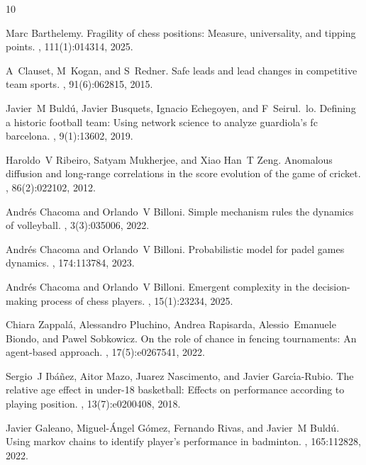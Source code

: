 \documentclass[preprint,12pt]{elsarticle}
\begin{document}
\begin{thebibliography}{10}

Marc Barthelemy.
\newblock Fragility of chess positions: Measure, universality, and tipping
  points.
, 111(1):014314, 2025.

A~Clauset, M~Kogan, and S~Redner.
\newblock Safe leads and lead changes in competitive team sports.
, 91(6):062815, 2015.

Javier~M Buld{\'u}, Javier Busquets, Ignacio Echegoyen, and F~Seirul.~lo.
\newblock Defining a historic football team: Using network science to analyze
  guardiola’s fc barcelona.
, 9(1):13602, 2019.

Haroldo~V Ribeiro, Satyam Mukherjee, and Xiao Han~T Zeng.
\newblock Anomalous diffusion and long-range correlations in the score
  evolution of the game of cricket.
, 86(2):022102, 2012.

Andr{\'e}s Chacoma and Orlando~V Billoni.
\newblock Simple mechanism rules the dynamics of volleyball.
, 3(3):035006, 2022.

Andr{\'e}s Chacoma and Orlando~V Billoni.
\newblock Probabilistic model for padel games dynamics.
, 174:113784, 2023.

Andr{\'e}s Chacoma and Orlando~V Billoni.
\newblock Emergent complexity in the decision-making process of chess players.
, 15(1):23234, 2025.

Chiara Zappal{\'a}, Alessandro Pluchino, Andrea Rapisarda, Alessio~Emanuele
  Biondo, and Pawel Sobkowicz.
\newblock On the role of chance in fencing tournaments: An agent-based
  approach.
, 17(5):e0267541, 2022.

Sergio~J Ib{\'a}{\~n}ez, Aitor Mazo, Juarez Nascimento, and Javier
  Garc{\'\i}a-Rubio.
\newblock The relative age effect in under-18 basketball: Effects on
  performance according to playing position.
, 13(7):e0200408, 2018.

Javier Galeano, Miguel-{\'A}ngel G{\'o}mez, Fernando Rivas, and Javier~M
  Buld{\'u}.
\newblock Using markov chains to identify player’s performance in badminton.
, 165:112828, 2022.


\end{thebibliography}
\end{document}
